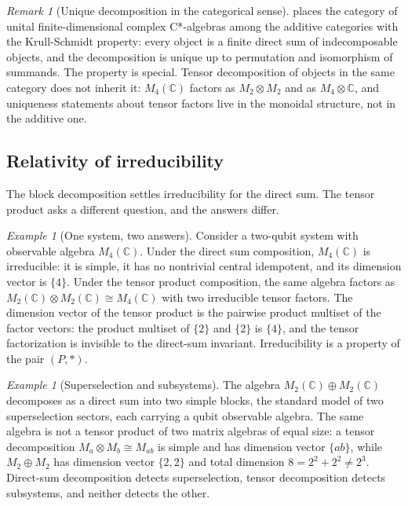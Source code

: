 \documentclass[11pt,letterpaper]{article}
\theoremstyle{definition}
\theoremstyle{remark}
\newtheorem{remark}[theorem]{Remark}
\newtheorem{example}[theorem]{Example}
\begin{document}
\begin{remark}[Unique decomposition in the categorical sense]
\label{rem:krull-schmidt}
 places the category of unital finite-dimensional complex C*-algebras among the additive categories with the Krull-Schmidt property: every object is a finite direct sum of indecomposable objects, and the decomposition is unique up to permutation and isomorphism of summands. The property is special. Tensor decomposition of objects in the same category does not inherit it: $M_4(\mathbb{C})$ factors as $M_2 \otimes M_2$ and as $M_4 \otimes \mathbb{C}$, and uniqueness statements about tensor factors live in the monoidal structure, not in the additive one.
\end{remark}

\subsection{Relativity of irreducibility}

The block decomposition settles irreducibility for the direct sum. The tensor product asks a different question, and the answers differ.

\begin{example}[One system, two answers]
\label{ex:two-answers}
Consider a two-qubit system with observable algebra $M_4(\mathbb{C})$. Under the direct sum composition, $M_4(\mathbb{C})$ is irreducible: it is simple, it has no nontrivial central idempotent, and its dimension vector is $\{4\}$. Under the tensor product composition, the same algebra factors as $M_2(\mathbb{C}) \otimes M_2(\mathbb{C}) \cong M_4(\mathbb{C})$ with two irreducible tensor factors. The dimension vector of the tensor product is the pairwise product multiset of the factor vectors: the product multiset of $\{2\}$ and $\{2\}$ is $\{4\}$, and the tensor factorization is invisible to the direct-sum invariant. Irreducibility is a property of the pair $(P, \ast)$.
\end{example}

\begin{example}[Superselection and subsystems]
\label{ex:superselection}
The algebra $M_2(\mathbb{C}) \oplus M_2(\mathbb{C})$ decomposes as a direct sum into two simple blocks, the standard model of two superselection sectors, each carrying a qubit observable algebra. The same algebra is not a tensor product of two matrix algebras of equal size: a tensor decomposition $M_a \otimes M_b \cong M_{ab}$ is simple and has dimension vector $\{ab\}$, while $M_2 \oplus M_2$ has dimension vector $\{2,2\}$ and total dimension $8 = 2^2 + 2^2 \neq 2^3$. Direct-sum decomposition detects superselection, tensor decomposition detects subsystems, and neither detects the other.
\end{example}
\end{document}
